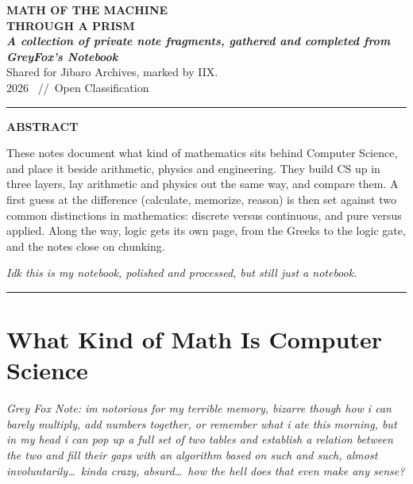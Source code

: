 \documentclass[11pt,a4paper]{article}
\newcommand{\gfnote}[1]{\par{\itshape Grey Fox Note: #1}\par}
\begin{document}
\begin{center}
{\fontsize{26}{30}\selectfont\bfseries MATH OF THE MACHINE\\[0.15em] THROUGH A PRISM}\\[0.9em]
{\itshape\bfseries A collection of private note fragments, gathered and completed from GreyFox's Notebook}\\[0.6em]
Shared for Jibaro Archives, marked by IIX.\\[0.2em]
{\small 2026 \ //\ Open Classification}
\end{center}

\vspace{-0.3em}
\noindent\rule{\textwidth}{0.6pt}

\begin{center}
{\bfseries ABSTRACT}
\end{center}
\vspace{-0.6em}

These notes document what kind of mathematics sits behind Computer Science, and place it
beside arithmetic, physics and engineering. They build CS up in three layers, lay arithmetic
and physics out the same way, and compare them. A first guess at the difference (calculate,
memorize, reason) is then set against two common distinctions in mathematics: discrete versus
continuous, and pure versus applied. Along the way, logic gets its own page, from the Greeks
to the logic gate, and the notes close on chunking.

\textit{Idk this is my notebook, polished and processed, but still just a notebook.}

\noindent\rule{\textwidth}{0.6pt}

\section{What Kind of Math Is Computer Science}

\gfnote{im notorious for my terrible memory, bizarre though how i can barely
multiply, add numbers together, or remember what i ate this morning, but in my head i can pop
up a full set of two tables and establish a relation between the two and fill their gaps with an
algorithm based on such and such, almost involuntarily\ldots\ kinda crazy, absurd\ldots\ how the hell
does that even make any sense?}
\end{document}
